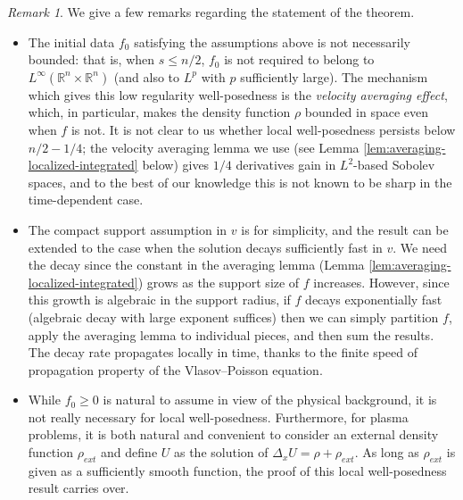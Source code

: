 \documentclass[11pt]{amsart}
\theoremstyle{definition}
\theoremstyle{remark}
\newtheorem{remark}[theorem]{Remark}
\numberwithin{equation}{section}
\newcommand{\lap}{\Delta}
\newcommand{\0}{\emptyset}
\newcommand{\bbR}{\mathbb R}
\begin{document}
	\begin{remark}
		We give a few remarks regarding the statement of the theorem. 
		
		\begin{itemize}
			\item The initial data $f_{0}$ satisfying the assumptions above is not necessarily bounded: that is, when $s \le n/2$, $f_{0}$ is not required to belong to $L^{\infty}(\bbR^n\times\bbR^n)$ (and also to $L^p$ with $p$ sufficiently large). The mechanism which gives this low regularity well-posedness is the \textit{velocity averaging effect}, which, in particular, makes the density function $\rho$ bounded in space even when $f$ is not. %
			It is not clear to us whether local well-posedness persists below $n/2 - 1/4$; the velocity averaging lemma we use (see Lemma  \ref{lem:averaging-localized-integrated} below) gives $1/4$ derivatives gain in $L^{2}$-based Sobolev spaces, and to the best of our knowledge this is not known to be sharp in the time-dependent case. 
			\item The compact support assumption in $v$ is for simplicity, and the result can be extended to the case when the solution decays sufficiently fast in $v$. {We need the decay since the constant in the averaging lemma (Lemma \ref{lem:averaging-localized-integrated}) grows as the support size of $f$ increases. However, since this growth is algebraic in the support radius, if $f$ decays exponentially fast (algebraic decay with large exponent suffices) then we can simply partition $f$, apply the averaging lemma to individual pieces, and then sum the results. The decay rate propagates locally in time, thanks to the finite speed of propagation property of the Vlasov--Poisson equation.}
			\item While $f_{0} \ge 0$ is natural to assume in view of the physical background, it is not really necessary for local well-posedness. Furthermore, for plasma problems, it is both natural and convenient to consider an external density function $\rho_{ext}$ and define $U$ as the solution of $\lap_{x}U = \rho + \rho_{ext}$. As long as $\rho_{ext}$ is given as a sufficiently smooth function, the proof of this local well-posedness result carries over. 
		\end{itemize}
		
	\end{remark} 
	
\end{document}
